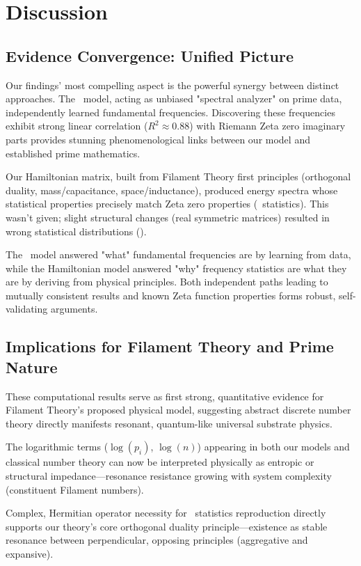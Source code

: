 \documentclass[11pt,a4paper]{article}
\newcommand{\GSE}{\text{GSE}}
\newcommand{\GUE}{\text{GUE}}
\newcommand{\GOE}{\text{GOE}}
\begin{document}
\section{Discussion}

\subsection{Evidence Convergence: Unified Picture}

Our findings' most compelling aspect is the powerful synergy between distinct approaches. The \GSE\ model, acting as unbiased "spectral analyzer" on prime data, independently learned fundamental frequencies. Discovering these frequencies exhibit strong linear correlation ($R^2 \approx 0.88$) with Riemann Zeta zero imaginary parts provides stunning phenomenological links between our model and established prime mathematics.

Our Hamiltonian matrix, built from Filament Theory first principles (orthogonal duality, mass/capacitance, space/inductance), produced energy spectra whose statistical properties precisely match Zeta zero properties (\GUE\ statistics). This wasn't given; slight structural changes (real symmetric matrices) resulted in wrong statistical distributions (\GOE).

The \GSE\ model answered "what" fundamental frequencies are by learning from data, while the Hamiltonian model answered "why" frequency statistics are what they are by deriving from physical principles. Both independent paths leading to mutually consistent results and known Zeta function properties forms robust, self-validating arguments.

\subsection{Implications for Filament Theory and Prime Nature}

These computational results serve as first strong, quantitative evidence for Filament Theory's proposed physical model, suggesting abstract discrete number theory directly manifests resonant, quantum-like universal substrate physics.

The logarithmic terms ($\log(p_i)$, $\log(n)$) appearing in both our models and classical number theory can now be interpreted physically as entropic or structural impedance—resonance resistance growing with system complexity (constituent Filament numbers).

Complex, Hermitian operator necessity for \GUE\ statistics reproduction directly supports our theory's core orthogonal duality principle—existence as stable resonance between perpendicular, opposing principles (aggregative and expansive).
\end{document}
